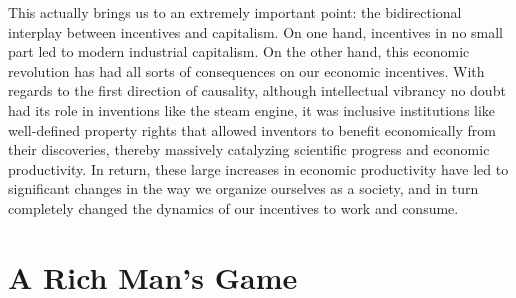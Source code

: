 \documentclass[12pt]{memoir}
\begin{document}
			This actually brings us to an extremely important point: the bidirectional interplay between incentives and capitalism. On one hand, incentives in no small part led to modern industrial capitalism. On the 
			other hand, this economic revolution has had all sorts of consequences on our economic incentives. With regards to the first direction of causality, although intellectual vibrancy no doubt had its role in 
			inventions like the steam engine, it was inclusive institutions like  well-defined property rights that allowed inventors to benefit economically from their discoveries, thereby massively 
			catalyzing scientific progress and economic productivity. In return, these large increases in economic productivity have led to significant changes in the way we organize ourselves as a 
			society, and in turn completely changed the dynamics of our incentives to work and consume.\
			
			
			
			
		
		 \section{A Rich Man's Game}
		 
\end{document}
